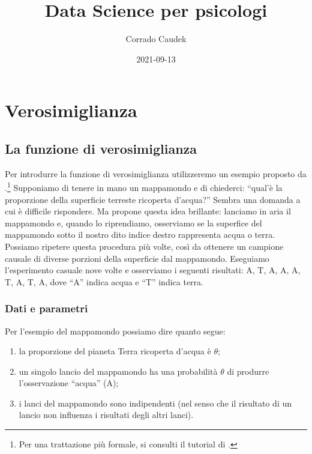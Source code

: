 \documentclass[
]{memoir}
\title{Data Science per psicologi}
\author{Corrado Caudek}
\date{2021-09-13}
\providecommand{\tightlist}{%
  \setlength{\itemsep}{0pt}\setlength{\parskip}{0pt}}
\theoremstyle{definition}
\theoremstyle{definition}
\theoremstyle{definition}
\theoremstyle{definition}
\theoremstyle{remark}
\begin{document}
\maketitle

{
\hypersetup{linkcolor=}
\setcounter{tocdepth}{1}
\tableofcontents
}
\newpage

\vspace*{5cm}

\thispagestyle{empty}

\hypertarget{part-verosimiglianza}{%
\part*{Verosimiglianza}\label{part-verosimiglianza}}

\hypertarget{la-funzione-di-verosimiglianza}{%
\chapter{La funzione di verosimiglianza}\label{la-funzione-di-verosimiglianza}}

Per introdurre la funzione di verosimiglianza utilizzeremo un esempio proposto da \citet{McElreath_rethinking}.\footnote{Per una trattazione più formale, si consulti il tutorial di \citet{etz2018introduction}.} Supponiamo di tenere in mano un mappamondo e di chiederci: ``qual'è la proporzione della superficie terreste ricoperta d'acqua?'' Sembra una domanda a cui è difficile rispondere. Ma \citet{McElreath_rethinking} propone questa idea brillante: lanciamo in aria il mappamondo e, quando lo riprendiamo, osserviamo se la superfice del mappamondo sotto il nostro dito indice destro rappresenta acqua o terra. Possiamo ripetere questa procedura più volte, così da ottenere un campione causale di diverse porzioni della superficie dal mappamondo. Eseguiamo l'esperimento casuale nove volte e osserviamo i seguenti risultati: A, T, A, A, A, T, A, T, A, dove ``A'' indica acqua e ``T'' indica terra.

\hypertarget{dati-e-parametri}{%
\section{Dati e parametri}\label{dati-e-parametri}}

Per l'esempio del mappamondo possiamo dire quanto segue:

\begin{enumerate}
\def\labelenumi{\arabic{enumi}.}
\tightlist
\item
  la proporzione del pianeta Terra ricoperta d'acqua è \(\theta\);
\item
  un singolo lancio del mappamondo ha una probabilità \(\theta\) di produrre l'osservazione ``acqua'' (A);
\item
  i lanci del mappamondo sono indipendenti (nel senso che il risultato
  di un lancio non influenza i risultati degli altri lanci).
\end{enumerate}
\end{document}
